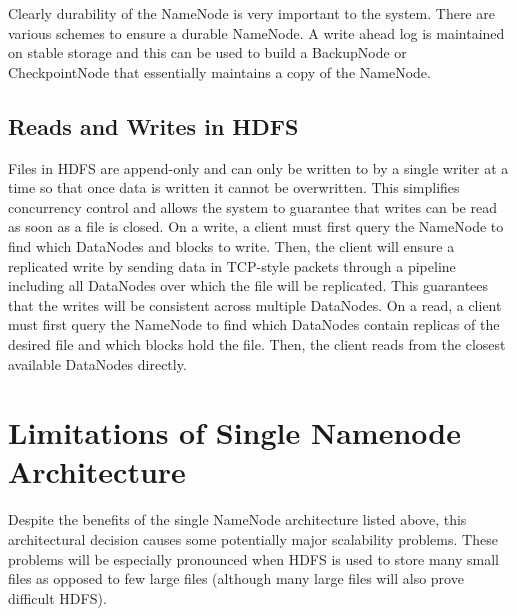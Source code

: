 \documentclass[11pt, a4paper]{article}
\begin{document}
\begin{multicols*}{2}
Clearly durability of the NameNode is very important to the system. There are various schemes to ensure a durable NameNode. A write ahead log is maintained on stable storage and this can be used to build a BackupNode or CheckpointNode that essentially maintains a copy of the NameNode. 







\subsection{Reads and Writes in HDFS}


Files in HDFS are append-only and can only be written to by a single writer at a time so that once data is written it cannot be overwritten. This simplifies concurrency control and allows the system to guarantee that writes can be read as soon as a file is closed. On a write, a client must first query the NameNode to find which DataNodes and blocks to write. Then, the client will ensure a replicated write by sending data in TCP-style packets through a pipeline including all DataNodes over which the file will be replicated. This guarantees that the writes will be consistent across multiple DataNodes. On a read, a client must first query the NameNode to find which DataNodes contain replicas of the desired file and which blocks hold the file. Then, the client reads from the closest available DataNodes directly. 


\section{Limitations of Single Namenode Architecture}

Despite the benefits of the single NameNode architecture listed above, this architectural decision causes some potentially major scalability problems. These problems will be especially pronounced when HDFS is used to store many small files as opposed to few large files (although many large files will also prove difficult HDFS). 


\end{multicols*}
\end{document}
